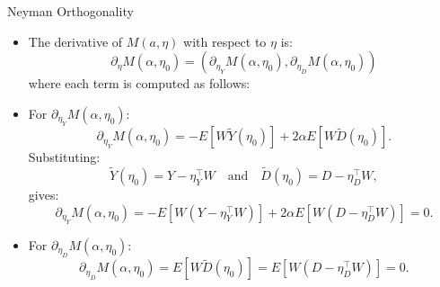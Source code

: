\documentclass[xcolor=svgnames,t]{beamer}
\begin{document}
                        \begin{frame}{Neyman Orthogonality }
    
                            \begin{itemize}
                                \item The derivative of \(M(a, \eta)\) with respect to \(\eta\) is:
                                \[
                                \partial_\eta M(\alpha, \eta_0) = (\partial_{\eta_Y} M(\alpha, \eta_0), \partial_{\eta_D} M(\alpha, \eta_0))
                                \]
                                where each term is computed as follows:
                                \pause
                                \item For \(\partial_{\eta_Y} M(\alpha, \eta_0)\):
                                \[
                                \partial_{\eta_Y} M(\alpha, \eta_0) = -E[W \tilde{Y}(\eta_0)] + 2\alpha E[W \tilde{D}(\eta_0)].
                                \]
                                Substituting:
                                \[
                                \tilde{Y}(\eta_0) = Y - \eta_Y^\top W \quad \text{and} \quad \tilde{D}(\eta_0) = D - \eta_D^\top W,
                                \]
                                gives:
                                \[
                                \partial_{\eta_Y} M(\alpha, \eta_0) = -E[W(Y - \eta_Y^\top W)] + 2\alpha E[W(D - \eta_D^\top W)]=0.
                                \]
                                \pause
                                \item For \(\partial_{\eta_D} M(\alpha, \eta_0)\):
                                \[
                                \partial_{\eta_D} M(\alpha, \eta_0) = E[W \tilde{D}(\eta_0)] = E[W(D - \eta_D^\top W)]=0.
                                \]
                            \end{itemize}
                            \end{frame}
                                              
                            
            
\end{document}
